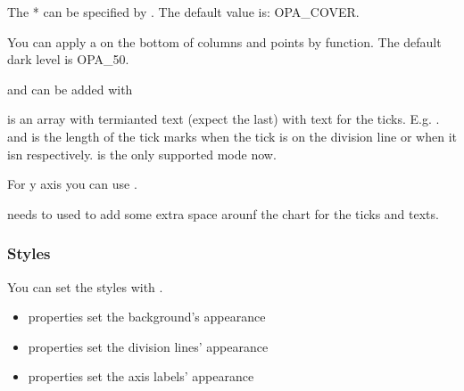 \documentclass[letterpaper,10pt,english]{sphinxmanual}
\begin{document}
The * can be specified by . The default value is: OPA\_COVER.

You can apply a  on the bottom of columns and points by  function. The default dark level is OPA\_50.

 and  can be added with

\begin{sphinxVerbatim}[commandchars=\\\{\}]
   
                       
\end{sphinxVerbatim}

 is an array with   termianted text (expect the last) with text for the ticks. E.g. .
 and  is the length of the tick marks when the tick is on the division line or when it isn respectively.  is the only supported mode now.

For y axis you can use .

 needs to used to add some extra space arounf the chart for the ticks and texts.


\subsubsection{Styles}
\label{\detokenize{object-types/chart:styles}}
You can set the styles with .
\begin{itemize}
\item {} 
 properties set the background’s appearance

\item {} 
 properties set the division lines’ appearance

\item {} 
 properties set the axis labels’ appearance

\end{itemize}
\end{document}
